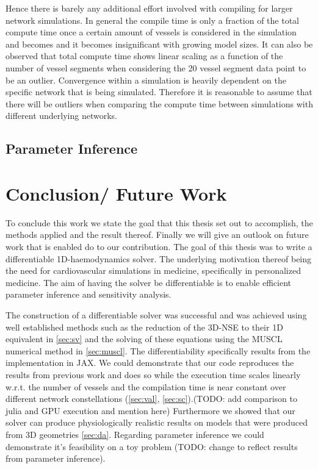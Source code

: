 \documentclass[a4paper, oneside]{discothesis}
\begin{document}
Hence there is barely any additional effort involved with compiling for larger network simulations.
In general the compile time is only a fraction of the total compute time once a certain amount of vessels is considered in the simulation and becomes and it becomes insignificant with growing model sizes.
It can also be observed that total compute time shows linear scaling as a function of the number of vessel segments when considering the 20 vessel segment data point to be an outlier.
Convergence within a simulation is heavily dependent on the specific network that is being simulated.
Therefore it is reasonable to assume that there will be outliers when comparing the compute time between simulations with different underlying networks.


\section{Parameter Inference} \label{sec:pi}

\chapter{Conclusion/ Future Work}
To conclude this work we state the goal that this thesis set out to accomplish, the methods applied and the result thereof.
Finally we will give an outlook on future work that is enabled do to our contribution.
The goal of this thesis was to write a differentiable 1D-haemodynamics solver.
The underlying motivation thereof being the need for cardiovascular simulations in medicine, specifically in personalized medicine.
The aim of having the solver be differentiable is to enable efficient parameter inference and sensitivity analysis.

The construction of a differentiable solver was successful and was achieved using well established methods such as the reduction of the 3D-NSE to their 1D equivalent in \autoref{sec:sv} and the solving of these equations using the MUSCL numerical method in \autoref{sec:muscl}.
The differentiability specifically results from the implementation in JAX.
We could demonstrate that our code reproduces the results from previous work and does so while the execution time scales linearly w.r.t. the number of vessels and the compilation time is near constant over different network constellations (\autoref{sec:val}, \autoref{sec:sc}).(TODO: add comparison to julia and GPU execution and mention here)
Furthermore we showed that our solver can produce physiologically realistic results on models that were produced from 3D geometries \autoref{sec:da}.
Regarding parameter inference we could demonstrate it's feasibility on a toy problem (TODO: change to reflect results from parameter inference).
\end{document}
